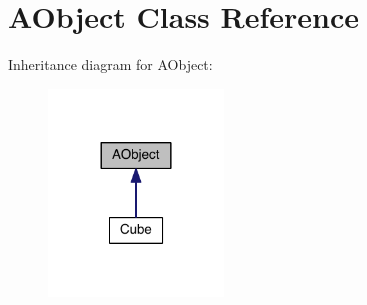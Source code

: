 \hypertarget{class_a_object}{}\section{A\+Object Class Reference}
\label{class_a_object}


Inheritance diagram for A\+Object\+:\nopagebreak
\begin{figure}[H]
\begin{center}
\leavevmode
\includegraphics[width=132pt]{class_a_object__inherit__graph}
\end{center}
\end{figure}
